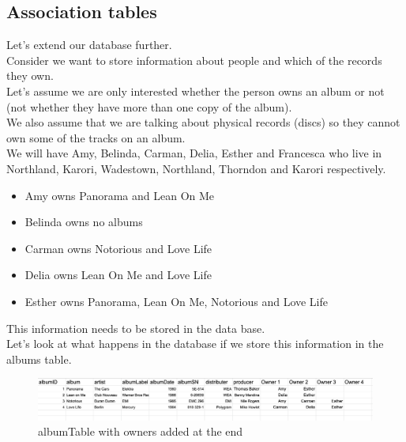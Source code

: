 \documentclass[a4paper,12pt]{article}
\begin{document}
 \subsection{Association tables}
 Let's extend our database further.\\
 Consider we want to store information about people and which of the records they own.\\
 Let's assume we are only interested whether the person owns an album or not (not whether they have more than one copy of the album).\\
 We also assume that we are talking about physical records (discs) so they cannot own some of the tracks on an album.\\
 We will have Amy, Belinda, Carman, Delia, Esther and Francesca who live in Northland, Karori, Wadestown, Northland, Thorndon and Karori respectively.
 \begin{itemize}
 	\item Amy owns Panorama and Lean On Me
 	\item Belinda owns no albums
 	\item Carman owns Notorious and Love Life
 	\item Delia owns Lean On Me and Love Life
 	\item Esther owns Panorama, Lean On Me, Notorious and Love Life
 \end{itemize}
This information needs to be stored in the data base.\\
Let's look at what happens in the database if we store this information in the albums table.

\begin{figure}[!h]
	\centering
	\includegraphics[width=18cm]{Owners_In_Album.png}
	\caption*{albumTable with owners added at the end}
\end{figure}
\end{document}
